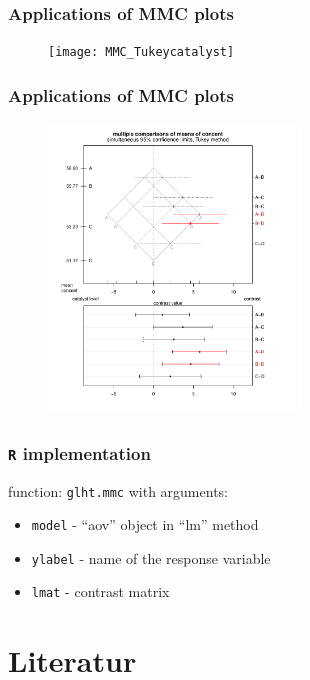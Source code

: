 \documentclass{beamer}
\begin{document}
\begin{frame}
\frametitle{Applications of MMC plots}
\begin{figure}
	\centering
		\texttt{[image: MMC\_Tukeycatalyst]}
	\label{fig:MMC5}
\end{figure}
\end{frame}

\begin{frame}
\frametitle{Applications of MMC plots}
\begin{figure}
	\centering
		\includegraphics[width=0.60\textwidth]{CI_catalyst_comparison}
	\label{fig:MMC6}
\end{figure}
\end{frame}



\begin{frame}
\frametitle{\texttt{R} implementation}
function: \texttt{glht.mmc} with arguments:
\renewcommand{\labelitemi}{>}
\begin{itemize}
	\item \texttt{model} -	"`aov"' object in "`lm"' method
	\item \texttt{ylabel} -	name of the response variable
	\item \texttt{lmat} -	contrast matrix
\end{itemize}

\end{frame}



\footnotesize
\section{Literatur}
\setcounter{page}{1}


\end{document}
